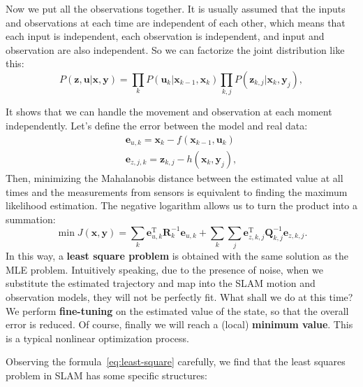 Now we put all the observations together. It is usually assumed that the inputs and observations at each time are independent of each other, which means that each input is independent, each observation is independent, and input and observation are also independent. So we can factorize the joint distribution like this:
\begin{equation}
	P\left( {\mathbf{z},\mathbf{u}|\mathbf{x},\mathbf{y}} \right) = \prod\limits_k {P\left( {{\mathbf{u}_k }|{\mathbf{x}_{k-1}},{\mathbf{x}_k}} \right)} \prod\limits_{k,j} {P\left( {{\mathbf{z} _{k,j}}|{\mathbf{x}_k},{\mathbf{y}_j}} \right)},
\end{equation}

It shows that we can handle the movement and observation at each moment independently. Let's define the error between the model and real data: 
\begin{equation}
	\begin{array}{l}
		{\mathbf{e}_{u,k}} = {\mathbf{x}_k}-f\left( {{\mathbf{x}_{k-1}},{\mathbf{u}_k} } \right)\\
		{\mathbf{e}_{z,j,k}} = {\mathbf{z}_{k,j}}-h\left( {{\mathbf{x}_k},{\mathbf{y} _j}} \right),
	\end{array}
\end{equation}
Then, minimizing the Mahalanobis distance between the estimated value at all times and the measurements from sensors is equivalent to finding the maximum likelihood estimation. The negative logarithm allows us to turn the product into a summation:
\begin{equation}
	\label{eq:least-square}
	\min J (\mathbf{x},\mathbf{y}) = \sum\limits_k {\mathbf{e}_{u,k}^\mathrm{T} \mathbf{R}_k^{-1} {\mathbf{e}_{u,k}}} + \sum\limits_k {\sum\limits_j {\mathbf{e}_{z,k,j}^\mathrm{T} \mathbf{Q}_ {k,j}^{-1}{\mathbf{e}_{z,k,j}}}}.
\end{equation}
In this way, a \textbf{least square problem} is obtained with the same solution as the MLE problem. Intuitively speaking, due to the presence of noise, when we substitute the estimated trajectory and map into the SLAM motion and observation models, they will not be perfectly fit. What shall we do at this time? We perform \textbf{fine-tuning} on the estimated value of the state, so that the overall error is reduced. Of course, finally we will reach a (local) \textbf{minimum value}. This is a typical nonlinear optimization process.

Observing the formula~\eqref{eq:least-square} carefully, we find that the least squares problem in SLAM has some specific structures:

